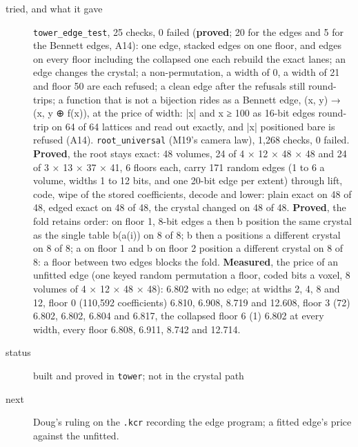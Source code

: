 \begin{description}
\item[{tried, and what it gave}] \texttt{tower\_\allowbreak{}edge\_\allowbreak{}test}, 25 checks, 0 failed (\textbf{proved}; 20 for the edges and 5 for the Bennett edges, A14): one edge, stacked edges on one floor, and edges on every floor including the collapsed one each rebuild the exact lanes; an edge changes the crystal; a non-permutation, a width of 0, a width of 21 and floor 50 are each refused; a clean edge after the refusals still round-trips; a function that is not a bijection rides as a Bennett edge, (x, y) → (x, y ⊕ f(x)), at the price of width: |x| and x ≥ 100 as 16-bit edges round-trip on 64 of 64 lattices and read out exactly, and |x| positioned bare is refused (A14). \texttt{root\_\allowbreak{}universal} (M19's camera law), 1,268 checks, 0 failed. \textbf{Proved}, the root stays exact: 48 volumes, 24 of 4 × 12 × 48 × 48 and 24 of 3 × 13 × 37 × 41, 6 floors each, carry 171 random edges (1 to 6 a volume, widths 1 to 12 bits, and one 20-bit edge per extent) through lift, code, wipe of the stored coefficients, decode and lower: plain exact on 48 of 48, edged exact on 48 of 48, the crystal changed on 48 of 48. \textbf{Proved}, the fold retains order: on floor 1, 8-bit edges a then b position the same crystal as the single table b(a(i)) on 8 of 8; b then a positions a different crystal on 8 of 8; a on floor 1 and b on floor 2 position a different crystal on 8 of 8: a floor between two edges blocks the fold. \textbf{Measured}, the price of an unfitted edge (one keyed random permutation a floor, coded bits a voxel, 8 volumes of 4 × 12 × 48 × 48): 6.802 with no edge; at widths 2, 4, 8 and 12, floor 0 (110,592 coefficients) 6.810, 6.908, 8.719 and 12.608, floor 3 (72) 6.802, 6.802, 6.804 and 6.817, the collapsed floor 6 (1) 6.802 at every width, every floor 6.808, 6.911, 8.742 and 12.714.
\item[{status}] built and proved in \texttt{tower}; not in the crystal path
\item[{next}] Doug's ruling on the \texttt{.\allowbreak{}kcr} recording the edge program; a fitted edge's price against the unfitted.
\end{description}


